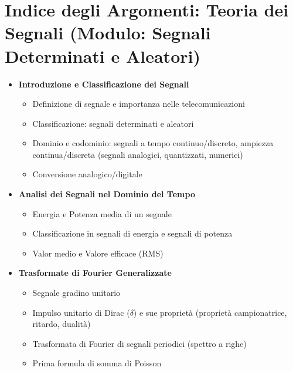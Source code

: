 \section*{Indice degli Argomenti: Teoria dei Segnali (Modulo: Segnali Determinati e Aleatori)}

\begin{itemize}

    \item \textbf{Introduzione e Classificazione dei Segnali}
          \begin{itemize}
              \item Definizione di segnale e importanza nelle telecomunicazioni
              \item Classificazione: segnali determinati e aleatori
              \item Dominio e codominio: segnali a tempo continuo/discreto, ampiezza continua/discreta (segnali analogici, quantizzati, numerici)
              \item Conversione analogico/digitale
          \end{itemize}

    \item \textbf{Analisi dei Segnali nel Dominio del Tempo}
          \begin{itemize}
              \item Energia e Potenza media di un segnale
              \item Classificazione in segnali di energia e segnali di potenza
              \item Valor medio e Valore efficace (RMS)
          \end{itemize}

    \item \textbf{Trasformate di Fourier Generalizzate}
          \begin{itemize}
              \item Segnale gradino unitario
              \item Impulso unitario di Dirac ($\delta$) e sue proprietà (proprietà campionatrice, ritardo, dualità)
              \item Trasformata di Fourier di segnali periodici (spettro a righe)
              \item Prima formula di somma di Poisson
          \end{itemize}


\end{itemize}
